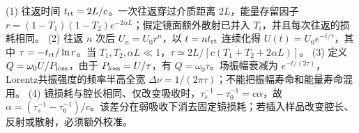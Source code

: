 (1) 往返时间 \(t_{\rm rt}=2L/c\)。一次往返穿过介质距离 \(2L\)，能量存留因子 \(r=(1-T_1)(1-T_2)e^{-2\alpha L}\)；假定镜面额外散射已并入 \(T_i\)，并且每次往返的损耗相同。
(2) 往返 \(n\) 次后 \(U_n=U_0r^n\)，以 \(t=nt_{\rm rt}\) 连续化得 \(U(t)=U_0e^{-t/\tau}\)，其中 \(\tau=-t_{\rm rt}/\ln r\)。当 \(T_1,T_2,\alpha L\ll1\)，\(\tau\simeq2L/[c(T_1+T_2+2\alpha L)]\)。
(3) 定义 \(Q=\omega_0U/P_{\rm loss}\)，由于 \(P_{\rm loss}=U/\tau\)，有 \(Q=\omega_0\tau\)。场振幅衰减为 \(e^{-t/(2\tau)}\)，Lorentz共振强度的频率半高全宽 \(\Delta\nu=1/(2\pi\tau)\)；不能把振幅寿命和能量寿命混用。
(4) 镜损耗与腔长相同、仅改变吸收时，\(\tau_s^{-1}-\tau_0^{-1}=c\alpha\)，故 \(\alpha=(\tau_s^{-1}-\tau_0^{-1})/c\)。该差分在弱吸收下消去固定镜损耗；若插入样品改变腔长、反射或散射，必须额外校准。
